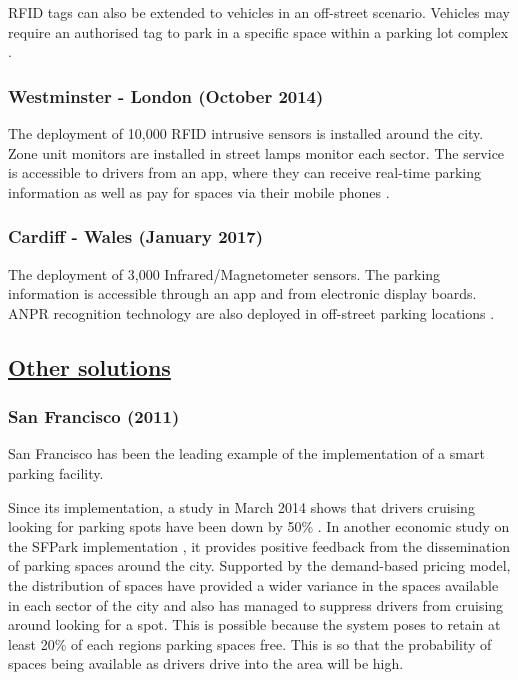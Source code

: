 \ac{RFID} tags can also be extended to vehicles in an off-street scenario. Vehicles may require an authorised tag to park in a specific space within a parking lot complex \citep{2017RFIDSmartParking}.

\subsubsection{Westminster - London (October 2014)}
The deployment of 10,000 RFID intrusive sensors is installed around the city. Zone unit monitors are installed in street lamps monitor each sector. The service is accessible to drivers from an app, where they can receive real-time parking information as well as pay for spaces via their mobile phones \citep{2013WestminsterSmartParking}.

\subsubsection{Cardiff - Wales (January 2017)}
The deployment of 3,000 Infrared/Magnetometer sensors. The parking information is accessible through an app and from electronic display boards. \ac{ANPR} recognition technology are also deployed in off-street parking locations \citep{2017CardiffSmartParking}.

\subsection*{\underline{Other solutions}}
\subsubsection{San Francisco (2011)}
San Francisco has been the leading example of the implementation of a smart parking facility.

Since its implementation, a study in March 2014 shows that drivers cruising looking for parking spots have been down by 50\% \citep{Millard-Ball2014IsExperiment}. In another economic study on the SFPark implementation \citep{Shriver2016UnderstandingProject}, it provides positive feedback from the dissemination of parking spaces around the city. Supported by the demand-based pricing model, the distribution of spaces have provided a wider variance in the spaces available in each sector of the city and also has managed to suppress drivers from cruising around looking for a spot. This is possible because the system poses to retain at least 20\% of each regions parking spaces free. This is so that the probability of spaces being available as drivers drive into the area will be high.